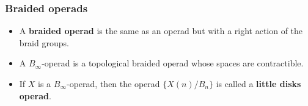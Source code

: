 \documentclass{beamer}
\theoremstyle{definition}
\newtheorem{prop}[teorema]{Proposition}
\begin{document}
 \begin{frame}
 	\frametitle{Braided operads}
 	\begin{itemize}
 		\item<1-> A \textbf{braided operad} is the same as an operad but with a right action of the braid groups. 
 		\item<2-> A $B_\infty$-operad is a topological braided operad whose spaces are contractible.
 		\item<3-> If $X$ is a $B_\infty$-operad, then the operad $\{X(n)/B_n\}$ is called a \textbf{little disks operad}.
 	\end{itemize}
 
 
\end{frame}
\end{document}

